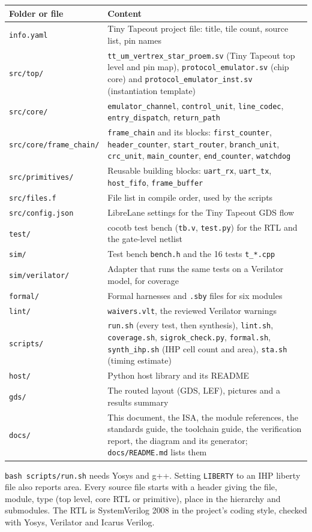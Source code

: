 \documentclass[11pt,a4paper]{article}
\newcommand{\sig}[1]{\texttt{#1}}
\begin{document}
\begin{center}
\begin{tabularx}{\linewidth}{@{}l>{\raggedright\arraybackslash}X@{}}
\toprule
Folder or file & Content \\
\midrule
\sig{info.yaml} & Tiny Tapeout project file: title, tile count, source list, pin names \\
\sig{src/top/} & \sig{tt\_um\_vertrex\_star\_proem.sv} (Tiny Tapeout top level and pin map), \sig{protocol\_emulator.sv} (chip core) and \sig{protocol\_emulator\_inst.sv} (instantiation template) \\
\sig{src/core/} & \sig{emulator\_channel}, \sig{control\_unit}, \sig{line\_codec}, \sig{entry\_dispatch}, \sig{return\_path} \\
\sig{src/core/frame\_chain/} & \sig{frame\_chain} and its blocks: \sig{first\_counter}, \sig{header\_counter}, \sig{start\_router}, \sig{branch\_unit}, \sig{crc\_unit}, \sig{main\_counter}, \sig{end\_counter}, \sig{watchdog} \\
\sig{src/primitives/} & Reusable building blocks: \sig{uart\_rx}, \sig{uart\_tx}, \sig{host\_fifo}, \sig{frame\_buffer} \\
\sig{src/files.f} & File list in compile order, used by the scripts \\
\sig{src/config.json} & LibreLane settings for the Tiny Tapeout GDS flow \\
\sig{test/} & cocotb test bench (\sig{tb.v}, \sig{test.py}) for the RTL and the gate-level netlist \\
\sig{sim/} & Test bench \sig{bench.h} and the 16 tests \sig{t\_*.cpp} \\
\sig{sim/verilator/} & Adapter that runs the same tests on a Verilator model, for coverage \\
\sig{formal/} & Formal harnesses and \sig{.sby} files for six modules \\
\sig{lint/} & \sig{waivers.vlt}, the reviewed Verilator warnings \\
\sig{scripts/} & \sig{run.sh} (every test, then synthesis), \sig{lint.sh}, \sig{coverage.sh}, \sig{sigrok\_check.py}, \sig{formal.sh}, \sig{synth\_ihp.sh} (IHP cell count and area), \sig{sta.sh} (timing estimate) \\
\sig{host/} & Python host library and its README \\
\sig{gds/} & The routed layout (GDS, LEF), pictures and a results summary \\
\sig{docs/} & This document, the ISA, the module references, the standards guide, the toolchain guide, the verification report, the diagram and its generator; \sig{docs/README.md} lists them \\
\bottomrule
\end{tabularx}
\end{center}

\sig{bash scripts/run.sh} needs Yosys and g++. Setting \sig{LIBERTY} to an IHP liberty file also reports area. Every source file starts with a header giving the file, module, type (top level, core RTL or primitive), place in the hierarchy and submodules. The RTL is SystemVerilog 2008 in the project's coding style, checked with Yosys, Verilator and Icarus Verilog.
\end{document}
